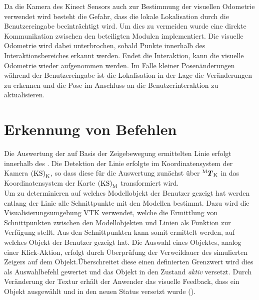 Da die Kamera des Kinect Sensors auch zur Bestimmung der visuellen Odometrie verwendet wird besteht die Gefahr, dass die lokale Lokalisation durch die Benutzereingabe beeinträchtigt wird. Um dies zu vermeiden wurde eine direkte Kommunikation zwischen den beteiligten Modulen implementiert. Die visuelle Odometrie wird dabei unterbrochen, sobald Punkte innerhalb des Interaktionsbereiches erkannt werden. Endet die Interaktion, kann die visuelle Odometrie wieder aufgenommen werden.
Im Falle kleiner Posenänderungen während der Benutzereingabe ist die Lokalisation in der Lage die Veränderungen zu erkennen und die Pose im Anschluss an die Benutzerinteraktion zu aktualisieren.

\section{Erkennung von Befehlen}
Die Auswertung der auf Basis der Zeigebewegung ermittelten Linie erfolgt innerhalb des \red[\mVisualization]. Die Detektion der Linie erfolgte im Koordinatensystem der Kamera ${\mathrm{(KS)}}_{\mathrm{K}}$, so dass diese für die Auswertung zunächst über ${^{\mathrm{M}}\mbox{\boldmath{$T$}}_{\mathrm{K}}}$ in das Koordinatensystem der Karte ${\mathrm{(KS)}}_{\mathrm{M}}$ transformiert wird.\\

Um zu determinieren auf welches Modellobjekt der Benutzer gezeigt hat werden entlang der Linie alle Schnittpunkte mit den Modellen bestimmt. Dazu wird die Visualisierungsumgebung VTK verwendet, welche die Ermittlung von Schnittpunkten zwischen den Modellobjekten und Linien als Funktion zur Verfügung stellt. Aus den Schnittpunkten kann somit ermittelt werden, auf welches Objekt der Benutzer gezeigt hat. Die Auswahl eines Objektes, analog einer \glqq Klick\grqq -Aktion, erfolgt durch Überprüfung der Verweildauer des simulierten Zeigers auf dem Objekt. Überschreitet diese einen definierten Grenzwert wird dies als Auswahlbefehl gewertet und das Objekt in den Zustand \textit{aktiv} versetzt. Durch Veränderung der Textur erhält der Anwender das visuelle Feedback, dass ein Objekt ausgewählt und in den neuen Status versetzt wurde ().\\

